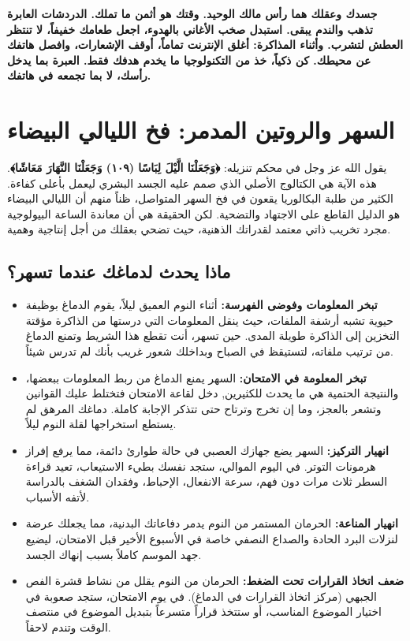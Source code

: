 \documentclass[12pt,a4paper]{book}
\newcommand{\importantAr}[1]{%
	\begin{important}
		\bfseries #1
	\end{important}
}
\begin{document}
\importantAr{جسدك وعقلك هما رأس مالك الوحيد. وقتك هو أثمن ما تملك. الدردشات العابرة تذهب والندم يبقى. استبدل صخب الأغاني بالهدوء، اجعل طعامك خفيفاً، لا تنتظر العطش لتشرب. وأثناء المذاكرة: أغلق الإنترنت تماماً، أوقف الإشعارات، وافصل هاتفك عن محيطك. كن ذكياً، خذ من التكنولوجيا ما يخدم هدفك فقط. العبرة بما يدخل رأسك، لا بما تجمعه في هاتفك.}

\section{السهر والروتين المدمر: فخ الليالي البيضاء}
\label{sec:silent-poisons2}

يقول الله عز وجل في محكم تنزيله: \textbf{﴿وَجَعَلْنَا الَّيْلَ لِبَاسًا (١٠٩) وَجَعَلْنَا النَّهَارَ مَعَاشًا﴾}. هذه الآية هي الكتالوج الأصلي الذي صمم عليه الجسد البشري ليعمل بأعلى كفاءة. الكثير من طلبة البكالوريا يقعون في فخ السهر المتواصل، ظناً منهم أن الليالي البيضاء هو الدليل القاطع على الاجتهاد والتضحية. لكن الحقيقة هي أن معاندة الساعة البيولوجية مجرد تخريب ذاتي معتمد لقدراتك الذهنية، حيث تضحي بعقلك من أجل إنتاجية وهمية.

\subsection{ماذا يحدث لدماغك عندما تسهر؟}

\begin{itemize}
	\item \textbf{تبخر المعلومات وفوضى الفهرسة:} أثناء النوم العميق ليلاً، يقوم الدماغ بوظيفة حيوية تشبه أرشفة الملفات، حيث ينقل المعلومات التي درستها من الذاكرة مؤقتة التخزين إلى الذاكرة طويلة المدى. حين تسهر، أنت تقطع هذا الشريط وتمنع الدماغ من ترتيب ملفاته، لتستيقظ في الصباح وبداخلك شعور غريب بأنك لم تدرس شيئاً.
	
	\item \textbf{تبخر المعلومة في الامتحان:} السهر يمنع الدماغ من ربط المعلومات ببعضها، والنتيجة الحتمية هي ما يحدث للكثيرين, دخل لقاعة الامتحان فتختلط عليك القوانين وتشعر بالعجز، وما إن تخرج وترتاح حتى تتذكر الإجابة كاملة. دماغك المرهق لم يستطع استخراجها لقلة النوم ليلاً.
	
	\item \textbf{انهيار التركيز:} السهر يضع جهازك العصبي في حالة طوارئ دائمة، مما يرفع إفراز هرمونات التوتر. في اليوم الموالي، ستجد نفسك بطيء الاستيعاب، تعيد قراءة السطر ثلاث مرات دون فهم، سرعة الانفعال، الإحباط، وفقدان الشغف بالدراسة لأتفه الأسباب.
	
	\item \textbf{انهيار المناعة:} الحرمان المستمر من النوم يدمر دفاعاتك البدنية، مما يجعلك عرضة لنزلات البرد الحادة والصداع النصفي خاصة في الأسبوع الأخير قبل الامتحان، ليضيع جهد الموسم كاملاً بسبب إنهاك الجسد.

	\item \textbf{ضعف اتخاذ القرارات تحت الضغط:} الحرمان من النوم يقلل من نشاط قشرة الفص الجبهي (مركز اتخاذ القرارات في الدماغ). في يوم الامتحان، ستجد صعوبة في اختيار الموضوع المناسب، أو ستتخذ قراراً متسرعاً بتبديل الموضوع في منتصف الوقت وتندم لاحقاً.
\end{itemize}
\end{document}
